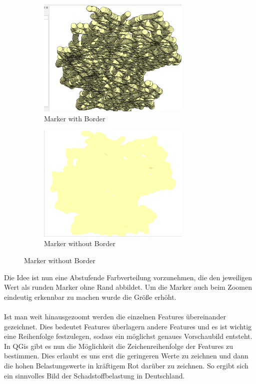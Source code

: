 \begin{figure}[h]
	\begin{subfigure}[b]{0.5\textwidth}
	\centering
	\includegraphics[width=0.8\textwidth]{images/Marker_Border.png}
	\caption{Marker with Border}
\end{subfigure}
	\begin{subfigure}[b]{0.5\textwidth}
	\centering
	\includegraphics[width=0.8\textwidth]{images/Marker_noBorder.png}
	\caption{Marker without Border}
\end{subfigure}
\end{figure}
Die Idee ist nun eine Abstufende Farbverteilung vorzunehmen, die den jeweiligen Wert als runden Marker ohne Rand abbildet. Um die Marker auch beim Zoomen eindeutig erkennbar zu machen wurde die Größe erhöht.
\\\\
Ist man weit hinausgezoomt werden die einzelnen Features übereinander gezeichnet. Dies bedeutet Features überlagern andere Features und es ist wichtig eine Reihenfolge festzulegen, sodass ein möglichst genaues Vorschaubild entsteht. In QGis gibt es nun die Möglichkeit die Zeichenreihenfolge der Features zu bestimmen. Dies erlaubt es uns erst die geringeren Werte zu zeichnen und dann die hohen Belastungswerte in kräftigem Rot darüber zu zeichnen. So ergibt sich ein sinnvolles Bild der Schadstoffbelastung in Deutschland.
